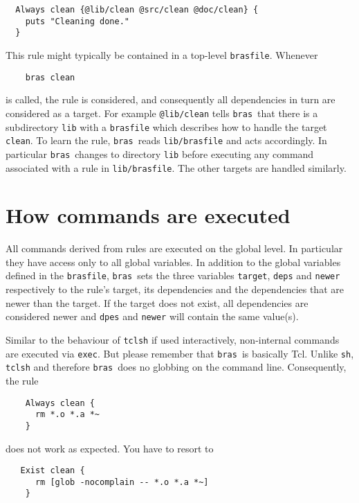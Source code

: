 \documentclass[12pt]{article}
\newcommand{\bras}{\texttt{bras}}
\begin{document}
\begin{verbatim}
  Always clean {@lib/clean @src/clean @doc/clean} {
    puts "Cleaning done."
  }
\end{verbatim}

This rule might typically be contained in a top-level
\texttt{brasfile}. Whenever 
\begin{verbatim}
    bras clean
\end{verbatim}
is called, the rule is considered, and consequently all
dependencies in turn are considered as a target. For example
\texttt{@lib/clean} tells \bras\ that there is a subdirectory
\texttt{lib} with a \texttt{brasfile} which
describes how to handle the target \texttt{clean}. To learn
the rule, \bras\ reads \texttt{lib/brasfile} and acts accordingly.
In particular \bras\ changes to directory \texttt{lib}
before executing any command associated with a rule in
\texttt{lib/brasfile}. The other targets are handled similarly.


\section{How commands are executed}

All commands derived from rules are executed on the global level.  In
particular they have access only to all global variables. In addition
to the global variables defined in the
\texttt{brasfile}, \bras\ sets the three variables \texttt{target},
\texttt{deps} and \texttt{newer} respectively to the rule's target, its
dependencies and the dependencies that are newer than the target. If
the target does not exist, all dependencies are considered newer and
\texttt{dpes} and \texttt{newer} will contain the same value(s).

Similar to the behaviour of \texttt{tclsh} if used
interactively, non-internal commands are executed
via \texttt{exec}. But please remember that \bras\ is basically
Tcl. Unlike \texttt{sh}, \texttt{tclsh} and therefore \bras\ does no
globbing on the command line. Consequently, the rule
\begin{verbatim}
    Always clean {
      rm *.o *.a *~
    }
\end{verbatim}
does not work as expected. You have to resort to
\begin{verbatim}
   Exist clean {
      rm [glob -nocomplain -- *.o *.a *~]
    }
\end{verbatim}
    
\end{document}
